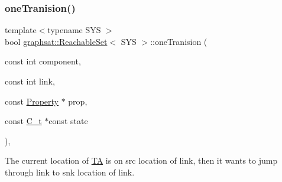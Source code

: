 \subsubsection{\texorpdfstring{oneTranision()}{oneTranision()}}
{\footnotesize\ttfamily template$<$typename S\+YS $>$ \\
bool \mbox{\hyperlink{classgraphsat_1_1_reachable_set}{graphsat\+::\+Reachable\+Set}}$<$ S\+YS $>$\+::one\+Tranision (\begin{DoxyParamCaption}\item[{const int}]{component,  }\item[{const int}]{link,  }\item[{const \mbox{\hyperlink{classgraphsat_1_1_property}{Property}} $\ast$}]{prop,  }\item[{const \mbox{\hyperlink{classgraphsat_1_1_reachable_set_a0b7981a216ec4c46be913e08d5f0cd07}{C\+\_\+t}} $\ast$const}]{state }\end{DoxyParamCaption})\hspace{0.3cm}{\ttfamily [inline]}, {\ttfamily [private]}}



The current location of \mbox{\hyperlink{classgraphsat_1_1_t_a}{TA}} is on src location of link, then it wants to jump through link to snk location of link. 



